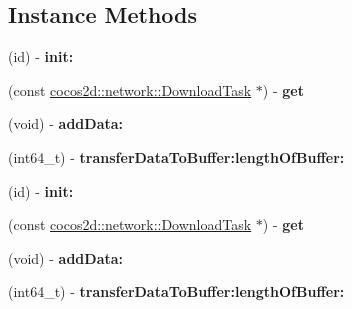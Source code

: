 \subsection*{Instance Methods}
\begin{DoxyCompactItemize}
\item 
\mbox{\label{interfaceDownloadTaskWrapper_a101d8a60cad42b00da4c324913feca55}} 
(id) -\/ {\bfseries init\+:}
\item 
\mbox{\label{interfaceDownloadTaskWrapper_aac1bfd687e6dcb631d54d6695521a4fb}} 
(const \hyperlink{classcocos2d_1_1network_1_1DownloadTask}{cocos2d\+::network\+::\+Download\+Task} $\ast$) -\/ {\bfseries get}
\item 
\mbox{\label{interfaceDownloadTaskWrapper_aad0f91699cfa2b2fb8670b28b467fbe7}} 
(void) -\/ {\bfseries add\+Data\+:}
\item 
\mbox{\label{interfaceDownloadTaskWrapper_a8f2fa835184513fdd81cac7ff1dc1b09}} 
(int64\+\_\+t) -\/ {\bfseries transfer\+Data\+To\+Buffer\+:length\+Of\+Buffer\+:}
\item 
\mbox{\label{interfaceDownloadTaskWrapper_a101d8a60cad42b00da4c324913feca55}} 
(id) -\/ {\bfseries init\+:}
\item 
\mbox{\label{interfaceDownloadTaskWrapper_aac1bfd687e6dcb631d54d6695521a4fb}} 
(const \hyperlink{classcocos2d_1_1network_1_1DownloadTask}{cocos2d\+::network\+::\+Download\+Task} $\ast$) -\/ {\bfseries get}
\item 
\mbox{\label{interfaceDownloadTaskWrapper_aad0f91699cfa2b2fb8670b28b467fbe7}} 
(void) -\/ {\bfseries add\+Data\+:}
\item 
\mbox{\label{interfaceDownloadTaskWrapper_a8f2fa835184513fdd81cac7ff1dc1b09}} 
(int64\+\_\+t) -\/ {\bfseries transfer\+Data\+To\+Buffer\+:length\+Of\+Buffer\+:}
\end{DoxyCompactItemize}
